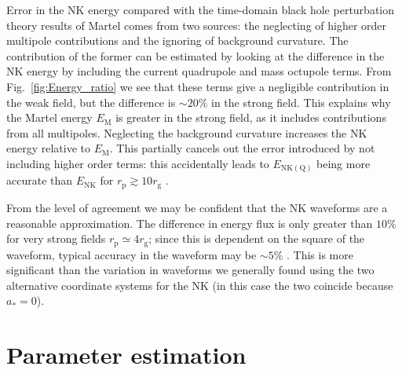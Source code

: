 \documentclass[useAMS,usedcolumn,usegraphicx,usenatbib]{mn2e}
\newcommand{\figref}[1]{Fig.~\ref{fig:#1}}
\newcommand{\sub}[1]{\ensuremath{_\mathrm{#1}}}
\begin{document}
Error in the NK energy compared with the time-domain black hole perturbation theory results of Martel comes from two sources: the neglecting of higher order multipole contributions and the ignoring of background curvature. The contribution of the former can be estimated by looking at the difference in the NK energy by including the current quadrupole and mass octupole terms. From \figref{Energy_ratio} we see that these terms give a negligible contribution in the weak field, but the difference is $\sim20\%$ in the strong field. This explains why the Martel energy $E\sub{M}$ is greater in the strong field, as it includes contributions from all multipoles. Neglecting the background curvature increases the NK energy relative to $E\sub{M}$. This partially cancels out the error introduced by not including higher order terms: this accidentally leads to $E\sub{NK(Q)}$ being more accurate than $E\sub{NK}$ for $r\sub{p} \gtrsim 10 r\sub{g}$ \citep{Tanaka1993}.

From the level of agreement we may be confident that the NK waveforms are a reasonable approximation. The difference in energy flux is only greater than $10\%$ for very strong fields $r\sub{p} \simeq 4 r\sub{g}$; since this is dependent on the square of the waveform, typical accuracy in the waveform may be $\sim 5\%$ \citep{Gair2005,Tanaka1993}. This is more significant than the variation in waveforms we generally found using the two alternative coordinate systems for the NK (in this case the two coincide because $a_\ast = 0$).

\section{Parameter estimation}\label{sec:Estimation}
\end{document}

